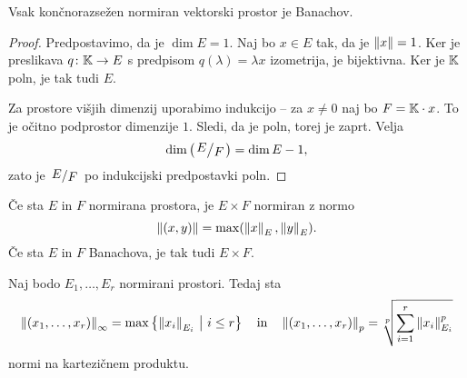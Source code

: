 \begin{posledica}
Vsak končnorazsežen normiran vektorski prostor je Banachov.
\end{posledica}

\begin{proof}
Predpostavimo, da je $\dim E = 1$. Naj bo $x \in E$ tak, da je
$\left\lVert x\right\rVert = 1$. Ker je preslikava $q \colon \mathbb{K} \to E$ s predpisom
$q(\lambda) = \lambda x$ izometrija, je bijektivna. Ker je $\mathbb{K}$
poln, je tak tudi $E$.

Za prostore višjih dimenzij uporabimo indukcijo -- za $x \ne 0$ naj
bo $F = \mathbb{K} \cdot x$. To je očitno podprostor dimenzije $1$. Sledi,
da je poln, torej je zaprt. Velja
\[
\dim \left(\kvoc{E}{F}\right) = \dim E - 1,
\]
zato je $\kvoc{E}{F}$ po indukcijski predpostavki poln.
\end{proof}

\begin{zgled}
Če sta $E$ in $F$ normirana prostora, je $E \times F$ normiran z
normo
\[
\left\lVert (x,y)\right\rVert = \max(\left\lVert x\right\rVert_E, \left\lVert y\right\rVert_E).
\]
Če sta $E$ in $F$ Banachova, je tak tudi $E \times F$.
\end{zgled}

\begin{zgled}
Naj bodo $E_1, \dots, E_r$ normirani prostori. Tedaj sta
\[
\left\lVert (x_1, \dots, x_r)\right\rVert_\infty =
\max \left\{\left\lVert x_i\right\rVert_{E_i}~\middle\vert~i \leq r\right\}
\quad \text{in} \quad
\left\lVert (x_1, \dots, x_r)\right\rVert_p =
\sqrt[p]{\sum_{i=1}^r \left\lVert x_i\right\rVert_{E_i}^p}
\]
normi na kartezičnem produktu.
\end{zgled}
